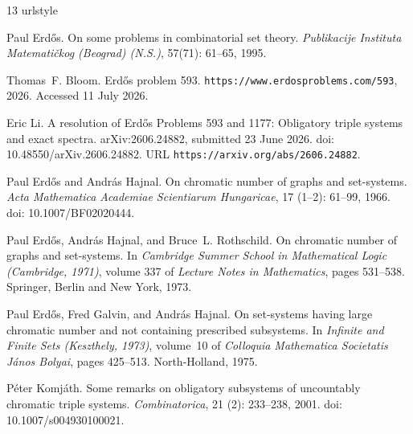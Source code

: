 \documentclass[a4paper,11pt,reqno]{amsart}
\theoremstyle{plain}
\theoremstyle{definition}
\theoremstyle{remark}
\begin{document}
\begin{thebibliography}{13}
\providecommand{\natexlab}[1]{#1}
\providecommand{\url}[1]{\texttt{#1}}
\expandafter\ifx\csname urlstyle\endcsname\relax
  \providecommand{\doi}[1]{doi: #1}\else
  \providecommand{\doi}{doi: \begingroup \urlstyle{rm}\Url}\fi

Paul Erd{\H{o}}s.
\newblock On some problems in combinatorial set theory.
\newblock \emph{Publikacije Instituta Matemati\v{c}kog (Beograd) (N.S.)},
  57(71): 61--65, 1995.

Thomas~F. Bloom.
\newblock Erd{\H{o}}s problem 593.
\newblock \url{https://www.erdosproblems.com/593}, 2026.
\newblock Accessed 11 July 2026.

Eric Li.
\newblock A resolution of {Erd{\H{o}}s Problems 593 and 1177}: Obligatory
  triple systems and exact spectra.
\newblock arXiv:2606.24882, submitted 23 June 2026.
\newblock \doi{10.48550/arXiv.2606.24882}.
\newblock URL \url{https://arxiv.org/abs/2606.24882}.

Paul Erd{\H{o}}s and Andr{\'a}s Hajnal.
\newblock On chromatic number of graphs and set-systems.
\newblock \emph{Acta Mathematica Academiae Scientiarum Hungaricae}, 17
  (1--2): 61--99, 1966.
\newblock \doi{10.1007/BF02020444}.

Paul Erd{\H{o}}s, Andr{\'a}s Hajnal, and Bruce~L. Rothschild.
\newblock On chromatic number of graphs and set-systems.
\newblock In \emph{Cambridge Summer School in Mathematical Logic (Cambridge,
  1971)}, volume 337 of \emph{Lecture Notes in Mathematics}, pages 531--538.
  Springer, Berlin and New York, 1973.

Paul Erd{\H{o}}s, Fred Galvin, and Andr{\'a}s Hajnal.
\newblock On set-systems having large chromatic number and not containing
  prescribed subsystems.
\newblock In \emph{Infinite and Finite Sets (Keszthely, 1973)}, volume~10 of
  \emph{Colloquia Mathematica Societatis J{\'a}nos Bolyai}, pages 425--513.
  North-Holland, 1975.

P{\'e}ter Komj{\'a}th.
\newblock Some remarks on obligatory subsystems of uncountably chromatic triple
  systems.
\newblock \emph{Combinatorica}, 21 (2): 233--238, 2001.
\newblock \doi{10.1007/s004930100021}.


\end{thebibliography}
\end{document}
